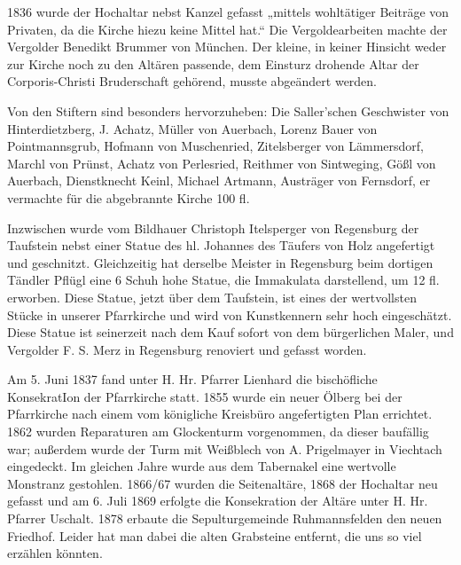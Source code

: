 \documentclass[12pt,a4paper]{book}
\begin{document}
1836 wurde der Hochaltar nebst Kanzel gefasst „mittels wohltätiger
Beiträge von Privaten, da die Kirche hiezu keine Mittel hat.“ Die
Vergoldearbeiten machte der Vergolder Benedikt Brummer von München. Der
kleine, in keiner Hinsicht weder zur Kirche noch zu den Altären
passende, dem Einsturz drohende Altar der Corporis-Christi Bruderschaft
gehörend, musste abgeändert werden.

Von den Stiftern sind besonders hervorzuheben: Die Saller'schen
Geschwister von Hinterdietzberg, J. Achatz, Müller von Auerbach, Lorenz
Bauer von Pointmannsgrub, Hofmann von Muschenried, Zitelsberger von
Lämmersdorf, Marchl von Prünst, Achatz von Perlesried, Reithmer von
Sintweging, Gößl von Auerbach, Dienstknecht Keinl, Michael Artmann,
Austräger von Fernsdorf, er vermachte für die abgebrannte Kirche 100 fl.

Inzwischen wurde vom Bildhauer Christoph Itelsperger von Regensburg der
Taufstein nebst einer Statue des hl. Johannes des Täufers von Holz
angefertigt und geschnitzt. Gleichzeitig hat derselbe Meister in
Regensburg beim dortigen Tändler Pflügl eine 6 Schuh hohe Statue, die
Immakulata darstellend, um 12 fl. erworben. Diese Statue, jetzt über dem
Taufstein, ist eines der wertvollsten Stücke in unserer Pfarrkirche und
wird von Kunstkennern sehr hoch eingeschätzt. Diese Statue ist
seinerzeit nach dem Kauf sofort von dem bürgerlichen Maler, und
Vergolder F. S. Merz in Regensburg renoviert und gefasst worden.

Am 5. Juni 1837 fand unter H. Hr. Pfarrer Lienhard die bischöfliche
KonsekratIon der Pfarrkirche statt. 1855 wurde ein neuer Ölberg bei der
Pfarrkirche nach einem vom königliche Kreisbüro angefertigten Plan
errichtet. 1862 wurden Reparaturen am Glockenturm vorgenommen, da dieser
baufällig war; außerdem wurde der Turm mit Weißblech von A. Prigelmayer
in Viechtach eingedeckt. Im gleichen Jahre wurde aus dem Tabernakel eine
wertvolle Monstranz gestohlen. 1866/67 wurden die Seitenaltäre, 1868 der
Hochaltar neu gefasst und am 6. Juli 1869 erfolgte die Konsekration der
Altäre unter H. Hr. Pfarrer Uschalt. 1878 erbaute die Sepulturgemeinde
Ruhmannsfelden den neuen Friedhof. Leider hat man dabei die alten
Grabsteine entfernt, die uns so viel erzählen könnten.
\end{document}
